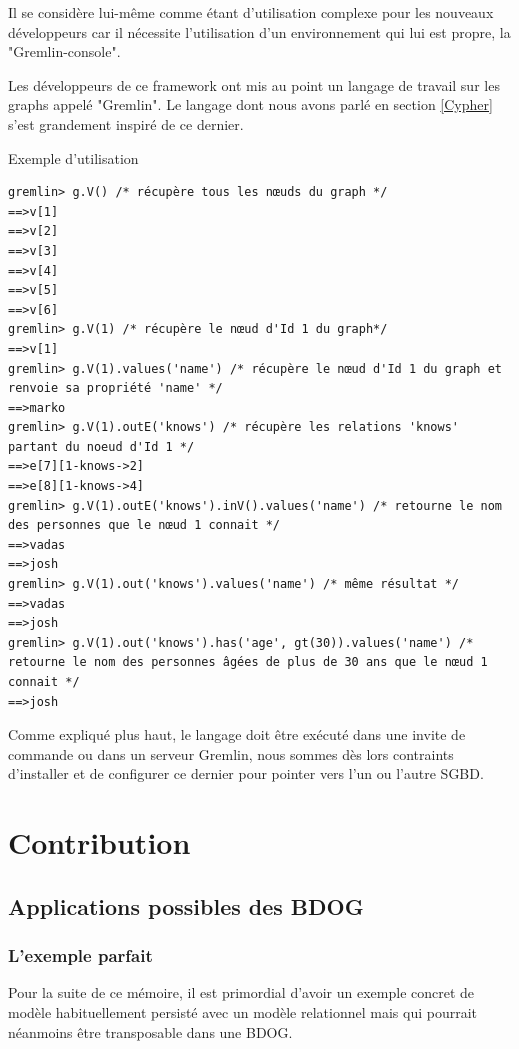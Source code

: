 \documentclass[a4paper,fleqn,12pt]{report}
\begin{document}
Il se considère lui-même comme étant d’utilisation complexe pour les nouveaux développeurs car il nécessite l’utilisation d’un environnement qui lui est propre, la "Gremlin-console".

Les développeurs de ce framework ont mis au point un langage de travail sur les graphs appelé "Gremlin". Le langage dont nous avons parlé en section \ref{Cypher} s’est grandement inspiré de ce dernier.

Exemple d’utilisation

\begin{lstlisting}
gremlin> g.V() /* récupère tous les nœuds du graph */
==>v[1]
==>v[2]
==>v[3]
==>v[4]
==>v[5]
==>v[6]
gremlin> g.V(1) /* récupère le nœud d'Id 1 du graph*/
==>v[1]
gremlin> g.V(1).values('name') /* récupère le nœud d'Id 1 du graph et renvoie sa propriété 'name' */
==>marko
gremlin> g.V(1).outE('knows') /* récupère les relations 'knows' partant du noeud d'Id 1 */
==>e[7][1-knows->2]
==>e[8][1-knows->4]
gremlin> g.V(1).outE('knows').inV().values('name') /* retourne le nom des personnes que le nœud 1 connait */
==>vadas
==>josh
gremlin> g.V(1).out('knows').values('name') /* même résultat */
==>vadas
==>josh
gremlin> g.V(1).out('knows').has('age', gt(30)).values('name') /* retourne le nom des personnes âgées de plus de 30 ans que le nœud 1 connait */
==>josh
\end{lstlisting}

Comme expliqué plus haut, le langage doit être exécuté dans une invite de commande ou dans un serveur Gremlin, nous sommes dès lors contraints d’installer et de configurer ce dernier pour pointer vers l’un ou l’autre SGBD.



\part{Contribution}
\chapter{Applications possibles des BDOG}

\section{L'exemple parfait}

Pour la suite de ce mémoire, il est primordial d'avoir un exemple concret de modèle habituellement persisté avec un modèle relationnel mais qui pourrait néanmoins être transposable dans une BDOG.
\end{document}
